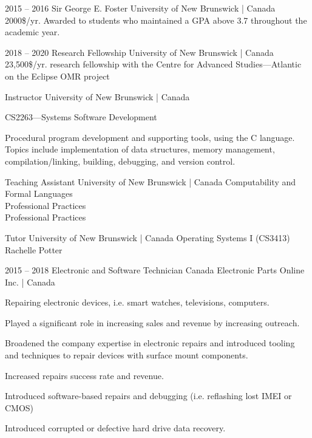 \documentclass{developercv} %
\begin{document}

\begin{entrylist}
	\entry
	{2015 -- 2016}
	{Sir George E. Foster}
	{University of New Brunswick | Canada}
	{2000\$/yr. Awarded to students who maintained a GPA above 3.7 throughout the academic year.}

	\entry
	{2018 -- 2020}
	{Research Fellowship}
	{University of New Brunswick | Canada}
	{23,500\$/yr. research fellowship  with the Centre for Advanced Studies---Atlantic on the Eclipse OMR project}
\end{entrylist}


\begin{entrylist}
	{Instructor}
	{University of New Brunswick | Canada}{
	\textbullet{} CS2263---Systems Software Development
	\begin{quoting}
		Procedural program development and supporting tools, using the C language.
		Topics include implementation of data structures, memory management, compilation/linking, building, debugging, and version control.
	\end{quoting}
	}

	{Teaching Assistant}
	{University of New Brunswick | Canada}
	{
	\textbullet{} Computability and Formal Languages\\
	\textbullet{} Professional Practices\\
	\textbullet{} Professional Practices\\
	}

	{Tutor}
	{University of New Brunswick | Canada}{
	\textbullet{} Operating Systems I (CS3413) Rachelle Potter
	}

	\entry
	{2015 -- 2018}
	{Electronic and Software Technician}
	{Canada Electronic Parts Online Inc. | Canada}{
		Repairing electronic devices, i.e. smart watches, televisions, computers.
		\begin{tightemize}
			\item Played a significant role in increasing sales and revenue by increasing outreach.
			\item Broadened the company expertise in electronic repairs and introduced tooling and techniques to repair devices with surface mount components.
			\item Increased repairs success rate and revenue.
			\item Introduced software-based repairs and debugging (i.e. reflashing lost IMEI or CMOS)
			\item Introduced corrupted or defective hard drive data recovery.
		\end{tightemize}
	}

\end{entrylist}
\end{document}
